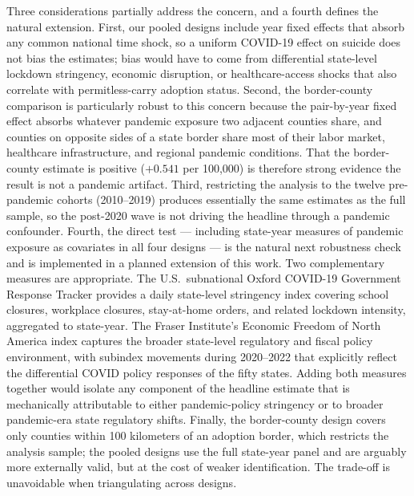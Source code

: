 \documentclass[12pt]{article}
\begin{document}
Three considerations partially address the concern, and a fourth
defines the natural extension. First, our pooled designs include
year fixed effects that absorb any common national time shock, so
a uniform COVID-19 effect on suicide does not bias the estimates;
bias would have to come from differential state-level lockdown
stringency, economic disruption, or healthcare-access shocks that
also correlate with permitless-carry adoption status. Second, the
border-county comparison is particularly robust to this concern
because the pair-by-year fixed effect absorbs whatever pandemic
exposure two adjacent counties share, and counties on opposite
sides of a state border share most of their labor market,
healthcare infrastructure, and regional pandemic conditions. That
the border-county estimate is positive ($+0.541$ per 100,000) is
therefore strong evidence the result is not a pandemic artifact.
Third, restricting the analysis to the twelve pre-pandemic cohorts
(2010--2019) produces essentially the same estimates as the full
sample, so the post-2020 wave is not driving the headline through a
pandemic confounder. Fourth, the direct test --- including state-year measures of
pandemic exposure as covariates in all four designs --- is the
natural next robustness check and is implemented in a planned
extension of this work. Two complementary measures are appropriate.
The U.S.\ subnational \citet{hale2021} Oxford COVID-19 Government
Response Tracker provides a daily state-level stringency index
covering school closures, workplace closures, stay-at-home orders,
and related lockdown intensity, aggregated to state-year. The
Fraser Institute's Economic Freedom of North America index
\citep{stansel2023} captures the broader state-level regulatory and
fiscal policy environment, with subindex movements during 2020--2022
that explicitly reflect the differential COVID policy responses of
the fifty states. Adding both measures together would isolate any
component of the headline estimate that is mechanically attributable
to either pandemic-policy stringency or to broader pandemic-era
state regulatory shifts. Finally, the
border-county design covers only counties within 100 kilometers of
an adoption border, which restricts the analysis sample; the
pooled designs use the full state-year panel and are arguably more
externally valid, but at the cost of weaker identification. The
trade-off is unavoidable when triangulating across designs.
\end{document}
